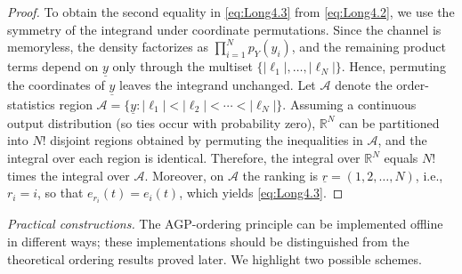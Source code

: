 \documentclass[letterpaper,draftclsnofoot,onecolumn]{IEEEtran}
\begin{document}
\begin{proof}
    To obtain the second equality in \eqref{eq:Long4.3} from \eqref{eq:Long4.2}, we use the symmetry of the integrand under coordinate permutations. Since the channel is memoryless, the density factorizes as $\prod_{i=1}^{N}p_Y(y_i)$, and the remaining product terms depend on $\underline{y}$ only through the multiset $\{|\ell_1|,\ldots,|\ell_N|\}$. Hence, permuting the coordinates of $\underline{y}$ leaves the integrand unchanged. Let $\mathcal{A}$ denote the order-statistics region $\mathcal{A}=\{\underline{y}:|\ell_1|<|\ell_2|<\cdots<|\ell_N|\}$. Assuming a continuous output distribution (so ties occur with probability zero), $\mathbb{R}^N$ can be partitioned into $N!$ disjoint regions obtained by permuting the inequalities in $\mathcal{A}$, and the integral over each region is identical. Therefore, the integral over $\mathbb{R}^N$ equals $N!$ times the integral over $\mathcal{A}$. Moreover, on $\mathcal{A}$ the ranking is $\underline{r}=(1,2,\ldots,N)$, i.e., $r_i=i$, so that $e_{r_i}(t)=e_i(t)$, which yields \eqref{eq:Long4.3}.
\end{proof}

\noindent\textit{Practical constructions.}
The AGP-ordering principle can be implemented offline in different ways; these implementations should be distinguished from the theoretical ordering results proved later. We highlight two possible schemes.
\end{document}
